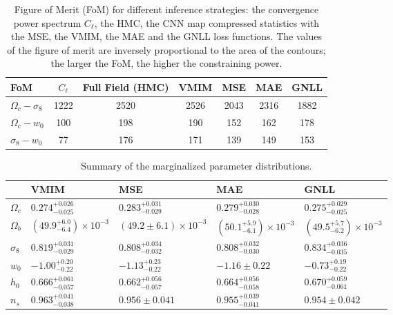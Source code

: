 \documentclass{aa}
\begin{document}
\begin{table}
    \begin{center}
        \begin{tabular}{lcccccc} 
            \hline
            FoM & $C_{\ell}$ & Full Field (HMC)&  VMIM & MSE & MAE & GNLL   \\
            \hline\hline
            $\Omega_c-  \sigma_8$ & 1222 & 2520 & 2526 & 2043 & 2316 & 1882 \\
            $\Omega_c-  w_0$      & 100  & 198  & 190  & 152  & 162  & 178  \\
            $\sigma_8-  w_0$      & 77   & 176  & 171  & 139  & 149  & 153  \\
            \hline
        \end{tabular}
        \caption{ Figure of Merit (FoM) for different inference strategies: the convergence power spectrum $C_{\ell}$, the HMC, the CNN map compressed statistics with the MSE, the VMIM, the MAE and the GNLL loss functions. The values of the figure of merit are inversely proportional to the area of the contours; the larger the FoM, the higher the constraining power.}
        \label{tab:f_o_m}
    \end{center}
\end{table}
\begin{table}
    \begin{center}
        \begin{tabular}{|l|l|l|l|l|}
            \hline
             & VMIM & MSE & MAE &GNLL \\
            \hline
            \hline
            $\Omega_c$ & $0.274^{+0.026}_{-0.025}$  & $0.283^{+0.031}_{-0.029}$  & $0.279^{+0.030}_{-0.028}$ & $0.275^{+0.029}_{-0.025}$\\
            \hline
            $\Omega_b$ & $ \left( 49.9^{+6.0}_{-6.4} \right) \times 10^{-3}$ &  $\left( 49.2\pm 6.1 \right) \times 10^{-3}$ &  $\left( 50.1^{+5.9}_{-6.1} \right) \times 10^{-3}$ & $\left( 49.5^{+5.7}_{-6.2} \right) \times 10^{-3}$ \\
            \hline
            $\sigma_8$ & $0.819^{+0.031}_{-0.029}$  & $0.808^{+0.034}_{-0.032}$  &  $0.808^{+0.032}_{-0.030}$ &  $0.834^{+0.036}_{-0.035}$ \\
            \hline
            $w_0$      & $-1.00^{+0.20}_{-0.22}$  & $-1.13^{+0.23}_{-0.22}$ &   $-1.16 \pm 0.22$  &  $-0.73^{+0.19}_{-0.22}$ \\
            \hline
            $h_0$      & $0.666^{+0.061}_{-0.057}$ & $0.662^{+0.056}_{-0.057}$  & $0.664^{+0.056}_{-0.058}$  & $0.670^{+0.059}_{-0.061}$\\
            \hline
            $n_s$      &  $0.963^{+0.041}_{-0.038}$ &  $0.956 \pm 0.041$ &  $0.955^{+0.039}_{-0.041}$  & $0.954\pm 0.042$\\
            \hline
        \end{tabular}
        \caption{Summary of the marginalized parameter distributions.}
        \label{tab:summaries}
  \end{center}
\end{table}
\end{document}
